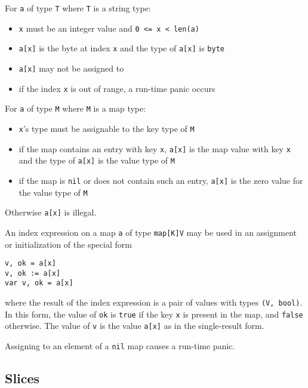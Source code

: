 {For \texttt{a} of type \texttt{T} where \texttt{T} is a
string type:

\begin{itemize}
\item
  \texttt{x} must be an integer value and
  \texttt{0 \textless{}= x \textless{} len(a)}
\item
  \texttt{a{[}x{]}} is the byte at index \texttt{x} and the type of
  \texttt{a{[}x{]}} is \texttt{byte}
\item
  \texttt{a{[}x{]}} may not be assigned to
\item
  if the index \texttt{x} is out of range, a
  run-time panic occurs
\end{itemize}

For \texttt{a} of type \texttt{M} where \texttt{M} is a
map type:

\begin{itemize}
\item
  \texttt{x}'s type must be assignable to the
  key type of \texttt{M}
\item
  if the map contains an entry with key \texttt{x}, \texttt{a{[}x{]}} is
  the map value with key \texttt{x} and the type of \texttt{a{[}x{]}} is
  the value type of \texttt{M}
\item
  if the map is \texttt{nil} or does not contain such an entry,
  \texttt{a{[}x{]}} is the zero value for
  the value type of \texttt{M}
\end{itemize}

Otherwise \texttt{a{[}x{]}} is illegal.

An index expression on a map \texttt{a} of type \texttt{map{[}K{]}V} may
be used in an assignment or initialization of the special form

\begin{Verbatim}[frame=single]
v, ok = a[x]
v, ok := a[x]
var v, ok = a[x]
\end{Verbatim}

where the result of the index expression is a pair of values with types
\texttt{(V, bool)}. In this form, the value of \texttt{ok} is
\texttt{true} if the key \texttt{x} is present in the map, and
\texttt{false} otherwise. The value of \texttt{v} is the value
\texttt{a{[}x{]}} as in the single-result form.

Assigning to an element of a \texttt{nil} map causes a
run-time panic.

\subsection*{Slices}

}
